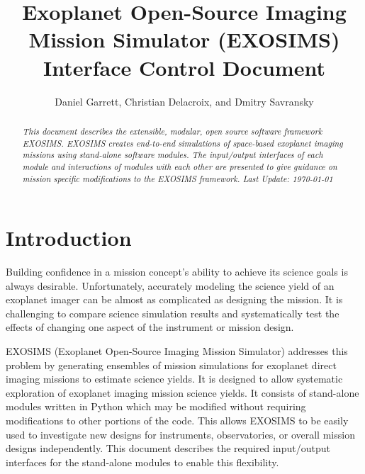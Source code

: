 \documentclass[cleanfoot]{asme2ej}
\title{Exoplanet Open-Source Imaging Mission Simulator (EXOSIMS) \\ Interface Control Document}
\author{Daniel Garrett, Christian Delacroix, and Dmitry Savransky
    \affiliation{
    Sibley School of Mechanical and Aerospace Engineering\\
	Cornell University\\
	Ithaca, NY 14853
    }	
}
\begin{document}
\maketitle    

\begin{abstract}
{\it This document describes the extensible, modular, open source software framework EXOSIMS.  EXOSIMS creates end-to-end simulations of space-based exoplanet imaging missions using stand-alone software modules.  The input/output interfaces of each module and interactions of modules with each other are presented to give guidance on mission specific modifications to the EXOSIMS framework. Last Update: \today}
\end{abstract}

\tableofcontents

\begin{nomenclature}
\end{nomenclature}


\section{Introduction} 
Building confidence in a mission concept's ability to achieve its science goals is always desirable.  Unfortunately, accurately modeling the science yield of an exoplanet imager can be almost as complicated as designing the mission.  It is challenging to compare science simulation results and systematically test the effects of changing one aspect of the instrument or mission design.

EXOSIMS (Exoplanet Open-Source Imaging Mission Simulator) addresses this problem by generating ensembles of mission simulations for exoplanet direct imaging missions to estimate science yields. It is designed to allow systematic exploration of exoplanet imaging mission science yields.  It consists of stand-alone modules written in Python which may be modified without requiring modifications to other portions of the code. This allows EXOSIMS to be easily used to investigate new designs for instruments, observatories, or overall mission designs independently. This document describes the required input/output interfaces for the stand-alone modules to enable this flexibility.
\end{document}
